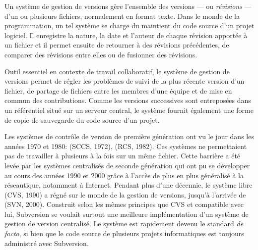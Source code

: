 Un système de gestion de versions gère l'ensemble des versions --- ou
\emph{révisions} --- d'un ou plusieurs fichiers, normalement en format
texte. Dans le monde de la programmation, un tel système se charge du
maintient du code source d'un projet logiciel. Il enregistre la
nature, la date et l'auteur de chaque révision apportée à un fichier
et il permet ensuite de retourner à des révisions précédentes, de
comparer des révisions entre elles ou de fusionner des révisions.

Outil essentiel en contexte de travail collaboratif, le système de
gestion de versions permet de régler les problèmes de suivi de la plus
récente version d'un fichier, de partage de fichiers entre les membres
d'une équipe et de mise en commun des contributions. Comme les
versions successives sont entreposées dans un référentiel situé sur un
serveur central, le système fournit également une forme de copie de
sauvegarde du code source d'un projet.


Les systèmes de contrôle de version de première génération ont vu le
jour dans les années 1970 et 1980:
 (SCCS, 1972),
 (RCS, 1982). Ces systèmes ne permettaient pas de
travailler à plusieurs à la fois sur un même fichier. Cette barrière a
été levée par les systèmes centralisés de seconde génération qui ont
pu se développer  au cours des années 1990 et 2000 grâce à l'accès de
plus en plus généralisé à la réseautique, notamment à Internet.
Pendant plus d'une décennie, le système libre
 (CVS, 1990) a régné sur le monde de la gestion
de versions, jusqu'à l'arrivée de
 (SVN, 2000). Construit selon les mêmes principes que
CVS et compatible avec lui, Subversion se voulait surtout une
meilleure implémentation d'un système de gestion de version
centralisé. Le système est rapidement devenu le standard \emph{de
  facto}, si bien que le code source de plusieurs projets
informatiques est toujours administré avec Subversion.

\enlargethispage{5mm}           %

